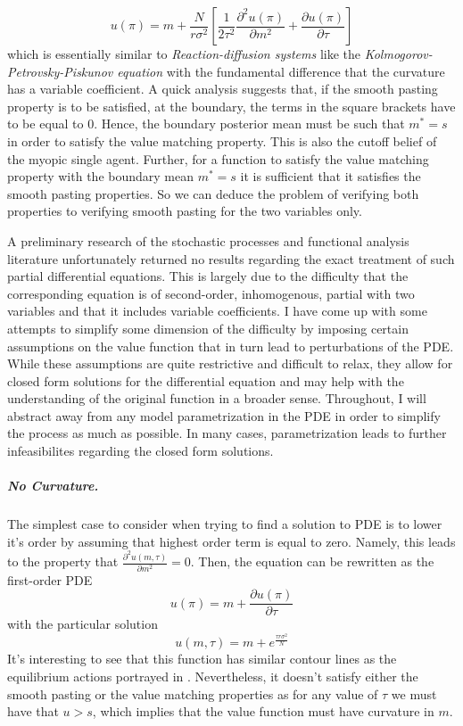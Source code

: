 \[u(\pi) = m + \frac{N}{r \sigma^2} \left[ \frac{1}{2\tau^2} \frac{\partial ^2u(\pi)}{\partial m^2} + \frac{\partial u(\pi)}{\partial \tau}\right]\]
which is essentially similar to \textit{Reaction-diffusion systems} like the \textit{Kolmogorov-Petrovsky-Piskunov equation} with the fundamental difference that the curvature has a variable coefficient. A quick analysis suggests that, if the smooth pasting property is to be satisfied, at the boundary, the terms in the square brackets have to be equal to $0$. Hence, the boundary posterior mean must be such that $m^* = s$ in order to satisfy the value matching property. This is also the cutoff belief of the myopic single agent. Further, for a function to satisfy the value matching property with the boundary mean $m^* = s$ it is sufficient that it satisfies the smooth pasting properties. So we can deduce the problem of verifying both properties to verifying smooth pasting for the two variables only.

A preliminary research of the stochastic processes and functional analysis literature unfortunately returned no results regarding the exact treatment of such partial differential equations. This is largely due to the difficulty that the corresponding equation is of second-order, inhomogenous, partial with two variables and that it includes variable coefficients. I have come up with some attempts to simplify some dimension of the difficulty by imposing certain assumptions on the value function that in turn lead to perturbations of the PDE. While these assumptions are quite restrictive and difficult to relax, they allow for closed form solutions for the differential equation and may help with the understanding of the original function in a broader sense. Throughout, I will abstract away from any model parametrization in the PDE in order to simplify the process as much as possible. In many cases, parametrization leads to further infeasibilites regarding the closed form solutions.

\subparagraph{No Curvature. } The simplest case to consider when trying to find a solution to PDE is to lower it's order by assuming that highest order term is equal to zero. Namely, this leads to the property that $\frac{\partial^2 u(m, \tau)}{\partial m^2} = 0$. Then, the equation can be rewritten as the first-order PDE
\[u(\pi) = m + \frac{\partial u(\pi)}{\partial \tau}\]
with the particular solution
\[ u(m,\tau) = m + e^{\frac{\tau r \sigma^2}{N}}\]
It's interesting to see that this function has similar contour lines as the equilibrium actions portrayed in \cite{keller2020undiscounted}. Nevertheless, it doesn't satisfy either the smooth pasting or the value matching properties as for any value of $\tau$ we must have that $u > s$, which implies that the value function must have curvature in $m$. 

